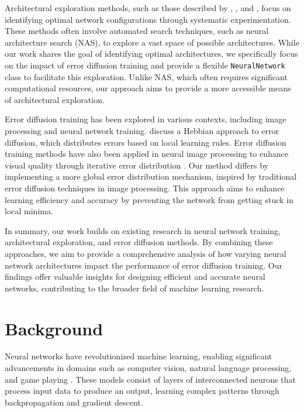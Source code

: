\documentclass{article} %
\begin{document}
Architectural exploration methods, such as those described by \citet{radford2019language}, \citet{vaswani2017attention}, and \citet{Zoph2016NeuralAS}, focus on identifying optimal network configurations through systematic experimentation. These methods often involve automated search techniques, such as neural architecture search (NAS), to explore a vast space of possible architectures. While our work shares the goal of identifying optimal architectures, we specifically focus on the impact of error diffusion training and provide a flexible \texttt{NeuralNetwork} class to facilitate this exploration. Unlike NAS, which often requires significant computational resources, our approach aims to provide a more accessible means of architectural exploration.

Error diffusion training has been explored in various contexts, including image processing and neural network training. \citet{journ2023hebbian} discuss a Hebbian approach to error diffusion, which distributes errors based on local learning rules. Error diffusion training methods have also been applied in neural image processing to enhance visual quality through iterative error distribution \citep{Lo2021ErrorDH}. Our method differs by implementing a more global error distribution mechanism, inspired by traditional error diffusion techniques in image processing. This approach aims to enhance learning efficiency and accuracy by preventing the network from getting stuck in local minima.

In summary, our work builds on existing research in neural network training, architectural exploration, and error diffusion methods. By combining these approaches, we aim to provide a comprehensive analysis of how varying neural network architectures impact the performance of error diffusion training. Our findings offer valuable insights for designing efficient and accurate neural networks, contributing to the broader field of machine learning research.

\section{Background}
\label{sec:background}

Neural networks have revolutionized machine learning, enabling significant advancements in domains such as computer vision, natural language processing, and game playing \citep{goodfellow2016deep}. These models consist of layers of interconnected neurons that process input data to produce an output, learning complex patterns through backpropagation and gradient descent.
\end{document}
